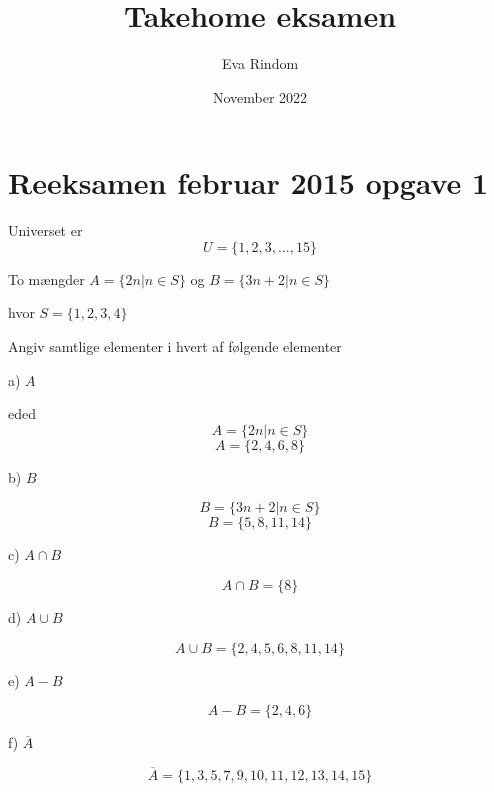 \documentclass{article}
\title{Takehome eksamen}
\author{Eva Rindom}
\date{November 2022}
\begin{document}
\maketitle

\section{Reeksamen februar 2015 opgave 1}

Universet er
\[U=\{1,2,3,...,15\}\]

To mængder \(A=\{2n | n \in S\}\) og \(B=\{3n+2 | n \in S\}\)


hvor \(S=\{1,2,3,4\}\)

Angiv samtlige elementer i hvert af følgende elementer

a) \(A\) \par
eded
\[A=\{2n | n \in S\}\]
\[A=\{2,4,6,8\}\]
\par
b) \(B\) \par
\[B=\{3n+2 | n \in S\}\]
\[B=\{5,8,11,14\}\]
\par
c) \(A \cap B\) \par
\[A \cap B=\{8\}\]\]
\par
d) \(A \cup B\) \par
\[A \cup B=\{2,4,5,6,8,11,14\}\]\]
\par
e) \(A - B\) \par
\[A - B=\{2,4,6\}\]\]
\par
f) \(\overline A\) \par
\[\overline A=\{1,3,5,7,9,10,11,12,13,14,15\}\]\]
\par
\end{document}
